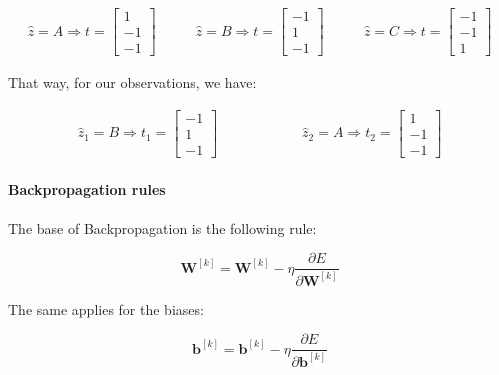 \documentclass[12pt]{article}
\begin{document}
\begin{enumerate}[leftmargin=\labelsep]
    \begin{equation}
    \begin{aligned}
        \hat{z} = A \Rightarrow t = \begin{bmatrix}
            1 \\ -1 \\ -1
        \end{bmatrix} &\qquad \hat{z} = B \Rightarrow t = \begin{bmatrix}
            -1 \\ 1 \\ -1
        \end{bmatrix} &\qquad \hat{z} = C \Rightarrow t = \begin{bmatrix}
            -1 \\ -1 \\ 1
        \end{bmatrix}
    \end{aligned}
    \end{equation}

    That way, for our observations, we have:

    \begin{equation}
    \begin{aligned}
        \hat{z}_1 = B \Rightarrow t_1 = \begin{bmatrix}
            -1 \\ 1 \\ -1
        \end{bmatrix} \qquad\qquad\qquad \hat{z}_2 = A \Rightarrow t_2 = \begin{bmatrix}
            1 \\ -1 \\ -1
        \end{bmatrix}
    \end{aligned}
    \end{equation}

    \paragraph{Backpropagation rules} The base of Backpropagation is the following rule:

    \begin{equation}
        \mathbf{W}^{[k]} = \mathbf{W}^{[k]} - \eta\frac{\partial E}{\partial \mathbf{W}^{[k]}}
    \end{equation}

    The same applies for the biases:

    \begin{equation}
        \mathbf{b}^{[k]} = \mathbf{b}^{[k]} - \eta\frac{\partial E}{\partial \mathbf{b}^{[k]}}
    \end{equation}


\end{enumerate}
\end{document}
